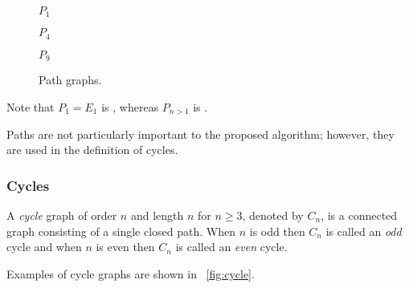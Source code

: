 \begin{figure}[H]
  \begin{minipage}{1in}
    \centering

    \(P_1\)
  \end{minipage}
  \begin{minipage}{2.5in}
    \centering

    \(P_4\)
  \end{minipage}
  \begin{minipage}{2in}
    \centering

    \(P_9\)
  \end{minipage}
  \caption{Path graphs.}
  \label{fig:path}
\end{figure}

Note that \(P_1=E_1\) is , whereas \(P_{n>1}\) is .

Paths are not particularly important to the proposed algorithm; however, they are used in the definition of cycles.

\subsubsection{Cycles}\label{sec:sub:sub:cycles}

A \emph{cycle} graph of order \(n\) and length \(n\) for \(n\ge3\), denoted by \(C_n\), is a connected graph
consisting of a single closed path.  When \(n\) is odd then \(C_n\) is called an \emph{odd} cycle and when \(n\) is
even then \(C_n\) is called an \emph{even} cycle.

Examples of cycle graphs are shown in \figurename~\ref{fig:cycle}.

